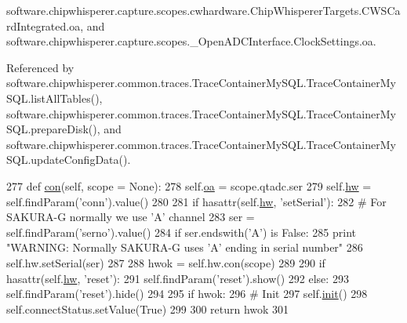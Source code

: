 software.\+chipwhisperer.\+capture.\+scopes.\+cwhardware.\+Chip\+Whisperer\+Targets.\+C\+W\+S\+Card\+Integrated.\+oa, and software.\+chipwhisperer.\+capture.\+scopes.\+\_\+\+Open\+A\+D\+C\+Interface.\+Clock\+Settings.\+oa.



Referenced by software.\+chipwhisperer.\+common.\+traces.\+Trace\+Container\+My\+S\+Q\+L.\+Trace\+Container\+My\+S\+Q\+L.\+list\+All\+Tables(), software.\+chipwhisperer.\+common.\+traces.\+Trace\+Container\+My\+S\+Q\+L.\+Trace\+Container\+My\+S\+Q\+L.\+prepare\+Disk(), and software.\+chipwhisperer.\+common.\+traces.\+Trace\+Container\+My\+S\+Q\+L.\+Trace\+Container\+My\+S\+Q\+L.\+update\+Config\+Data().


\begin{DoxyCode}
277     \textcolor{keyword}{def }\hyperlink{classsoftware_1_1chipwhisperer_1_1capture_1_1targets_1_1SAKURAG_1_1SakuraG_a280eb7d169b80ae3f2c6697c2385d356}{con}(self, scope = None):
278         self.\hyperlink{classsoftware_1_1chipwhisperer_1_1capture_1_1targets_1_1SAKURAG_1_1SakuraG_aad77970643e7d071044557f9619c552f}{oa} = scope.qtadc.ser
279         self.\hyperlink{classsoftware_1_1chipwhisperer_1_1capture_1_1targets_1_1SAKURAG_1_1SakuraG_acaf33f684dd48cf38734cbde5feacfe9}{hw} = self.findParam(\textcolor{stringliteral}{'conn'}).value()
280 
281         \textcolor{keywordflow}{if} hasattr(self.\hyperlink{classsoftware_1_1chipwhisperer_1_1capture_1_1targets_1_1SAKURAG_1_1SakuraG_acaf33f684dd48cf38734cbde5feacfe9}{hw}, \textcolor{stringliteral}{'setSerial'}):
282             \textcolor{comment}{# For SAKURA-G normally we use 'A' channel}
283             ser = self.findParam(\textcolor{stringliteral}{'serno'}).value()
284             \textcolor{keywordflow}{if} ser.endswith(\textcolor{stringliteral}{'A'}) \textcolor{keywordflow}{is} \textcolor{keyword}{False}:
285                 \textcolor{keywordflow}{print} \textcolor{stringliteral}{"WARNING: Normally SAKURA-G uses 'A' ending in serial number"}
286             self.hw.setSerial(ser)
287 
288         hwok = self.hw.con(scope)
289 
290         \textcolor{keywordflow}{if} hasattr(self.\hyperlink{classsoftware_1_1chipwhisperer_1_1capture_1_1targets_1_1SAKURAG_1_1SakuraG_acaf33f684dd48cf38734cbde5feacfe9}{hw}, \textcolor{stringliteral}{'reset'}):
291             self.findParam(\textcolor{stringliteral}{'reset'}).show()
292         \textcolor{keywordflow}{else}:
293             self.findParam(\textcolor{stringliteral}{'reset'}).hide()
294 
295         \textcolor{keywordflow}{if} hwok:
296             \textcolor{comment}{# Init}
297             self.\hyperlink{classsoftware_1_1chipwhisperer_1_1capture_1_1targets_1_1SAKURAG_1_1SakuraG_ab46fbdbcf973e547af7cb2b4f24fc696}{init}()
298         self.connectStatus.setValue(\textcolor{keyword}{True})
299 
300         \textcolor{keywordflow}{return} hwok
301 
\end{DoxyCode}
